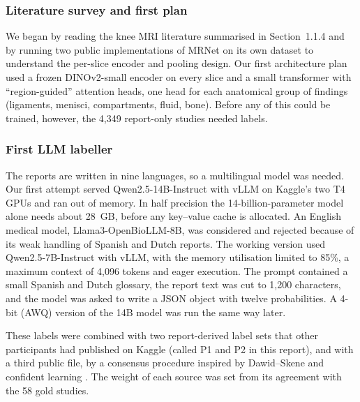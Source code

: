 \subsubsection{Literature survey and first plan} We began by reading the knee MRI literature summarised in Section~1.1.4 and by running two public implementations of MRNet on its own dataset to understand the per-slice encoder and pooling design. Our first architecture plan used a frozen DINOv2-small encoder \cite{oquab2024dinov2} on every slice and a small transformer with ``region-guided'' attention heads, one head for each anatomical group of findings (ligaments, menisci, compartments, fluid, bone). Before any of this could be trained, however, the 4,349 report-only studies needed labels.

\subsubsection{First LLM labeller} The reports are written in nine languages, so a multilingual model was needed. Our first attempt served Qwen2.5-14B-Instruct \cite{qwen2025qwen25} with vLLM on Kaggle's two T4 GPUs and ran out of memory. In half precision the 14-billion-parameter model alone needs about 28~GB, before any key--value cache is allocated. An English medical model, Llama3-OpenBioLLM-8B, was considered and rejected because of its weak handling of Spanish and Dutch reports. The working version used Qwen2.5-7B-Instruct with vLLM, with the memory utilisation limited to 85\%, a maximum context of 4,096 tokens and eager execution. The prompt contained a small Spanish and Dutch glossary, the report text was cut to 1,200 characters, and the model was asked to write a JSON object with twelve probabilities. A 4-bit (AWQ) version of the 14B model was run the same way later.

These labels were combined with two report-derived label sets that other participants had published on Kaggle (called P1 and P2 in this report), and with a third public file, by a consensus procedure inspired by Dawid--Skene \cite{dawid1979} and confident learning \cite{northcutt2021cl}. The weight of each source was set from its agreement with the 58 gold studies.

